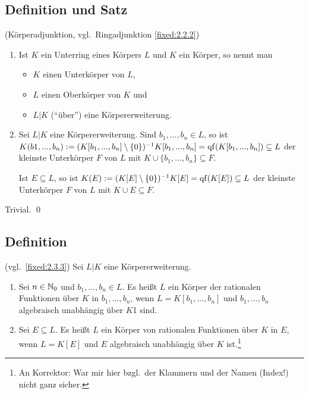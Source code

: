 \subsection{Definition und Satz} (Körperadjunktion, vgl.~Ringadjunktion \ref{fixed:2.2.2})
\begin{enumerate}[label=(\alph*)]
	\item
		Ist $K$ ein Unterring eines Körpers $L$ und $K$ ein Körper, so nennt man
		\begin{itemize}[label=$-$]
			\item
				$K$ einen Unterkörper von $L$,
			\item
				$L$ einen Oberkörper von $K$ und
			\item
				$L|K$ ("`über"') eine Körpererweiterung.
		\end{itemize}
	
	\item
		Sei $L|K$ eine Körpererweiterung. Sind $b_1,...,b_n \in L$, so ist $K(b1,...,b_n) := (K[b_1,...,b_n]\setminus\{0\})^{-1} K[b_1,...,b_n] = \operatorname{qf}(K[b_1,...,b_n]) \subseteq L$ der kleinste Unterkörper $F$ von $L$ mit $K \cup \{b_1,...,b_n\} \subseteq F$.
	
		Ist $E \subseteq L$, so ist $K(E) := (K[E]\setminus\{0\})^{-1} K[E] = \operatorname{qf}(K[E]) \subseteq L$ der kleinste Unterkörper $F$ von $L$ mit $K \cup E \subseteq F$.
\end{enumerate}

\proof Trivial. \qed

\subsection{Definition} (vgl.~\ref{fixed:2.3.3}) Sei $L|K$ eine Körpererweiterung.
\begin{enumerate}[label=(\alph*)]
	\item
		Sei $n \in \mathbb N_0$ und $b_1,...,b_n \in L$. Es heißt $L$ ein Körper der rationalen Funktionen über $K$ in $b_1,...,b_n$, wenn $L = K[b_1,...,b_n]$ und $b_1,...,b_n$ algebraisch unabhängig über $K$1 sind.
		
	\item
		Sei $E \subseteq L$. Es heißt $L$ ein Körper von rationalen Funktionen über $K$ in $E$, wenn $L = K[E]$ und $E$ algebraisch unabhängig über $K$ ist.\footnote{An Korrektor: War mir hier bzgl.~der Klammern und der Namen (Index!) nicht ganz sicher.}
\end{enumerate}

